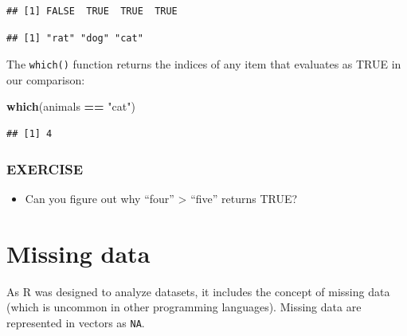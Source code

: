 \documentclass[]{book}
\newenvironment{Shaded}{\begin{snugshade}}{\end{snugshade}}
\newcommand{\KeywordTok}[1]{\textcolor[rgb]{0.13,0.29,0.53}{\textbf{#1}}}
\newcommand{\NormalTok}[1]{#1}
\newcommand{\OperatorTok}[1]{\textcolor[rgb]{0.81,0.36,0.00}{\textbf{#1}}}
\newcommand{\StringTok}[1]{\textcolor[rgb]{0.31,0.60,0.02}{#1}}
\providecommand{\tightlist}{%
  \setlength{\itemsep}{0pt}\setlength{\parskip}{0pt}}
\begin{document}
\begin{verbatim}
## [1] FALSE  TRUE  TRUE  TRUE
\end{verbatim}

\begin{Shaded}
\end{Shaded}

\begin{verbatim}
## [1] "rat" "dog" "cat"
\end{verbatim}

The \texttt{which()} function returns the indices of any item that evaluates as TRUE in our comparison:

\begin{Shaded}
\begin{Highlighting}[]
\KeywordTok{which}\NormalTok{(animals }\OperatorTok{==}\StringTok{ "cat"}\NormalTok{)}
\end{Highlighting}
\end{Shaded}

\begin{verbatim}
## [1] 4
\end{verbatim}

\hypertarget{exercise-7}{%
\subsubsection*{EXERCISE}\label{exercise-7}}

\begin{itemize}
\tightlist
\item
  Can you figure out why ``four'' \textgreater{} ``five'' returns TRUE?
\end{itemize}

\hypertarget{missing-data}{%
\section{Missing data}\label{missing-data}}

As R was designed to analyze datasets, it includes the concept of missing data (which is uncommon in other programming languages). Missing data are represented in vectors as \texttt{NA}.
\end{document}

